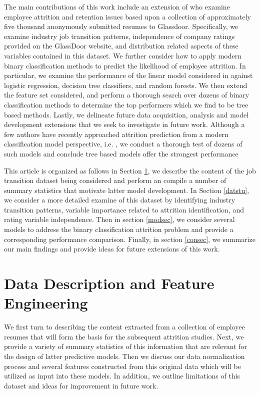 \documentclass[10pt]{article}
\begin{document}
The main contributions of this work include an extension of \cite{Smart2016} who examine employee 
attrition and retention issues based upon 
a collection of approximately five thousand anonymously submitted resumes to Glassdoor.  
Specifically, we examine industry job transition patterns, independence of company ratings 
provided on the GlassDoor website, and distribution related aspects of these variables 
contained in this dataset.  We further consider how to apply modern binary classification 
methods to predict the likelihood of employee attrition.  In particular, we examine the 
performance of the linear model considered in \cite{Smart2016} against logistic regression, 
decision tree classifiers, and random forests.  We then extend the feature set considered, 
and perform a thorough search over dozens of binary classification methods to determine 
the top performers which we find to be tree based methods.
 Lastly, we delineate 
future data acquisition, analysis and model development extensions that we seek to investigate 
in future work. Although a few authors have recently approached attrition prediction 
from a modern classification model perspective, i.e. \cite{Fri2018}, we conduct a 
thorough test of dozens of such models and conclude tree based models offer the strongest performance

This article is organized as follows in Section \ref{datsec}, we describe the content 
of the job transition dataset being considered and perform an compile a number of 
summary statistics that motivate latter model development.  In Section \ref{datstu},
we consider a more detailed examine of this dataset by identifying industry transition 
patterns, variable importance related to attrition identification, and 
rating variable independence.  Then in section \ref{modsec}, we consider several 
models to address the binary classification attrition problem and provide a 
corresponding performance comparison.  Finally, in section \ref{consec}, we 
summarize our main findings and provide ideas for future extensions of this work.

\section{Data Description and Feature Engineering} \label{datsec}

We first turn to describing the content extracted from a collection of 
employee resumes that will form the basis for the subsequent attrition studies. 
Next, we provide a variety of summary statistics of this information that 
are relevant for the design of latter predictive models.  Then we discuss 
our data normalization process and 
several features constructed from this original data which will be utilized 
as input into these models.
In addition, we outline limitations of this dataset and ideas for improvement  
in future work.
\end{document}
